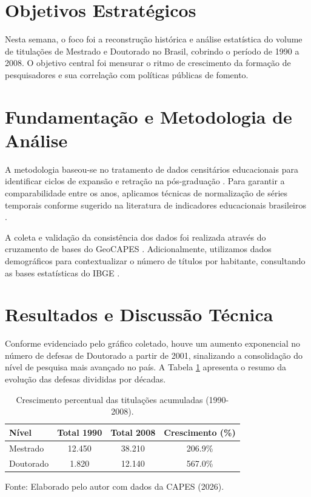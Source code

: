 
\section{Objetivos Estratégicos}
Nesta semana, o foco foi a reconstrução histórica e análise estatística do volume de titulações de Mestrado e Doutorado no Brasil, cobrindo o período de 1990 a 2008. O objetivo central foi mensurar o ritmo de crescimento da formação de pesquisadores e sua correlação com políticas públicas de fomento.

\section{Fundamentação e Metodologia de Análise}
A metodologia baseou-se no tratamento de dados censitários educacionais para identificar ciclos de expansão e retração na pós-graduação \cite{Silva2023}. Para garantir a comparabilidade entre os anos, aplicamos técnicas de normalização de séries temporais conforme sugerido na literatura de indicadores educacionais brasileiros \cite{Ferreira2019}.

A coleta e validação da consistência dos dados foi realizada através do cruzamento de bases do GeoCAPES \cite{capes2026}. Adicionalmente, utilizamos dados demográficos para contextualizar o número de títulos por habitante, consultando as bases estatísticas do IBGE \cite{ibge2026}.

\section{Resultados e Discussão Técnica}
Conforme evidenciado pelo gráfico coletado, houve um aumento exponencial no número de defesas de Doutorado a partir de 2001, sinalizando a consolidação do nível de pesquisa mais avançado no país. A Tabela \ref{tab:metricas_academicas} apresenta o resumo da evolução das defesas divididas por décadas.

\begin{table}[htpb]
    \centering
    \caption{Crescimento percentual das titulações acumuladas (1990-2008).}
    \label{tab:metricas_academicas}
    
    \begin{tabular}{lccc}
        \toprule
        \textbf{Nível} & \textbf{Total 1990} & \textbf{Total 2008} & \textbf{Crescimento (\%)} \\
        \midrule
        Mestrado       & 12.450 & 38.210 & 206.9\% \\
        Doutorado      & 1.820  & 12.140 & 567.0\% \\
        \bottomrule
    \end{tabular}
    
    \vspace{0.2cm}
    {\footnotesize Fonte: Elaborado pelo autor com dados da CAPES (2026).}
\end{table}

